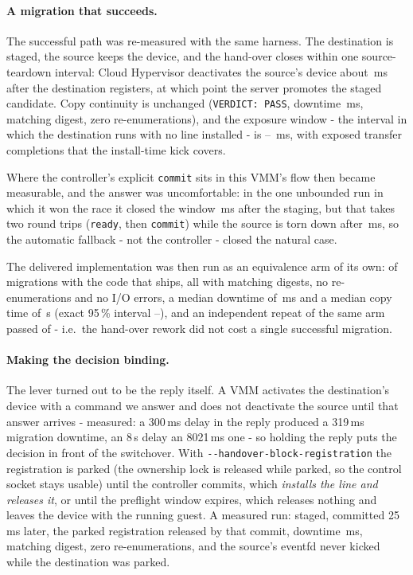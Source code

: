 \documentclass[10pt,conference]{IEEEtran}
\newcommand{\code}[1]{\texttt{#1}}
\begin{document}
\paragraph{A migration that succeeds.}
The successful path was re-measured with the same harness. The destination is
staged, the source keeps the device, and the hand-over closes within one
source-teardown interval: Cloud Hypervisor deactivates the source's device about
\TwoPhaseTeardownMs\,ms after the destination registers, at which point the
server promotes the staged candidate. Copy continuity is unchanged
(\code{VERDICT: PASS}, downtime \TwoPhaseDowntimeMs\,ms, matching digest, zero
re-enumerations), and the exposure window - the interval in which the
destination runs with no line installed - is \TwoPhaseWindowMin--%
\TwoPhaseWindowMax\,ms, with \TwoPhaseExposed{} exposed transfer completions that
the install-time kick covers.

Where the controller's explicit \code{commit} sits in this VMM's flow then
became measurable, and the answer was uncomfortable: in the one unbounded run in
which it won the race it closed the window \TwoPhaseCommitMs\,ms after the
staging, but that takes two round trips (\code{ready}, then \code{commit}) while
the source is torn down after \TwoPhaseTeardownMs\,ms, so the automatic fallback
- not the controller - closed the natural case.

The delivered implementation was then run as an equivalence arm of its own:
\FinalPass{} of \FinalRuns{} migrations with the code that ships, all with
matching digests, no re-enumerations and no I/O errors, a median downtime of
\FinalDowntimeMedian\,ms and a median copy time of \FinalCopyMedian\,s
(exact 95\,\% interval \FinalCPLow--\FinalCPHigh), and an independent repeat of
the same arm passed \FinalRepPass{} of \FinalRepRuns{} - i.e.\ the hand-over
rework did not cost a single successful migration.

\paragraph{Making the decision binding.}
The lever turned out to be the reply itself. A VMM activates the destination's
device with a command we answer and does not deactivate the source until that
answer arrives - measured: a 300\,ms delay in the reply produced a 319\,ms
migration downtime, an 8\,s delay an 8021\,ms one - so holding the reply puts
the decision in front of the switchover. With
\code{-{}-handover-block-registration} the registration is parked (the ownership
lock is released while parked, so the control socket stays usable) until the
controller commits, which \emph{installs the line and releases it}, or until the
preflight window expires, which releases nothing and leaves the device with the
running guest. A measured run: staged, committed 25\,ms later, the parked
registration released by that commit, downtime \BindDowntimeMs\,ms, matching
digest, zero re-enumerations, and the source's eventfd never kicked while the
destination was parked.
\end{document}
